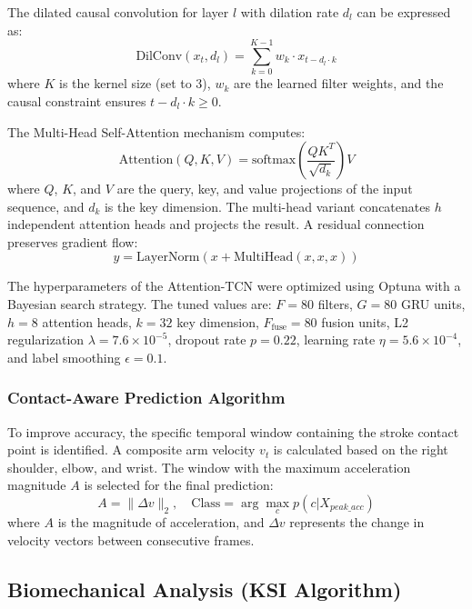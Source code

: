\documentclass[pdflatex,sn-mathphys-num]{sn-jnl}%
\theoremstyle{thmstyleone}%
\theoremstyle{thmstyletwo}%
\theoremstyle{thmstylethree}%
\begin{document}
The dilated causal convolution for layer $l$ with dilation rate $d_l$ can be expressed as:
\begin{equation}
\text{DilConv}(x_t, d_l) = \sum_{k=0}^{K-1} w_k \cdot x_{t - d_l \cdot k}
\end{equation}
\noindent where $K$ is the kernel size (set to 3), $w_k$ are the learned filter weights, and the causal constraint ensures $t - d_l \cdot k \ge 0$.

The Multi-Head Self-Attention mechanism computes:
\begin{equation}
\text{Attention}(Q, K, V) = \text{softmax}\left(\frac{QK^T}{\sqrt{d_k}}\right) V
\end{equation}
\noindent where $Q$, $K$, and $V$ are the query, key, and value projections of the input sequence, and $d_k$ is the key dimension. The multi-head variant concatenates $h$ independent attention heads and projects the result. A residual connection preserves gradient flow:
\begin{equation}
y = \text{LayerNorm}(x + \text{MultiHead}(x, x, x))
\end{equation}

The hyperparameters of the Attention-TCN were optimized using Optuna \cite{b41} with a Bayesian search strategy. The tuned values are: $F = 80$ filters, $G = 80$ GRU units, $h = 8$ attention heads, $k = 32$ key dimension, $F_{\text{fuse}} = 80$ fusion units, L2 regularization $\lambda = 7.6 \times 10^{-5}$, dropout rate $p = 0.22$, learning rate $\eta = 5.6 \times 10^{-4}$, and label smoothing $\epsilon = 0.1$.

\subsubsection{Contact-Aware Prediction Algorithm}
To improve accuracy, the specific temporal window containing the stroke contact point is identified. A composite arm velocity $v_t$ is calculated based on the right shoulder, elbow, and wrist. The window with the maximum acceleration magnitude $A$ is selected for the final prediction:
\begin{equation}
A = \|\Delta v\|_2, \quad \text{Class} = \arg\max_{c} p(c | X_{peak\_acc})
\end{equation}
\noindent where $A$ is the magnitude of acceleration, and $\Delta v$ represents the change in velocity vectors between consecutive frames.

\subsection{Biomechanical Analysis (KSI Algorithm)}
\end{document}
